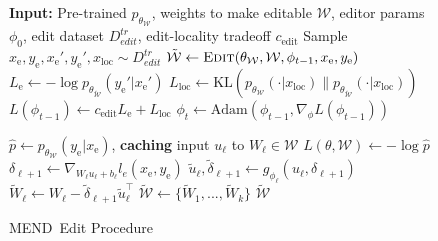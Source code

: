 \documentclass{article}
\newcommand{\name}{MEND}
\newcommand{\xe}{x_\text{e}}
\newcommand{\xloc}{x_\text{loc}}
\newcommand{\ye}{y_\text{e}}
\newcommand{\losse}{L_\text{e}}
\newcommand{\lossl}{L_\text{loc}}
\newcommand{\dtrain}{D^{tr}_{edit}}
\begin{document}
\begin{figure}
\begin{minipage}[t]{0.45\textwidth}
\begin{algorithm}[H]
\small
\caption{\name~Training}\label{alg:training}
\begin{algorithmic}[1]
\State \textbf{Input:} Pre-trained $p_{\theta_\mathcal{W}}$, weights to make editable $\mathcal{W}$, editor params $\phi_0$, edit dataset $\dtrain$, edit-locality tradeoff $c_\text{edit}$
    \State Sample $\xe,\ye,\xe',\ye',\xloc\sim \dtrain$
    \State $\mathcal{\tilde W} \gets \textsc{Edit}(\theta_\mathcal{W},\mathcal{W},\phi_{t-1},\xe,\ye)$
    \State $\losse \gets -\log p_{\theta_\mathcal{\tilde W}}(\ye'|\xe')$
    \State $\lossl \gets \text{KL}(p_{\theta_\mathcal{W}}(\cdot|\xloc) \| p_{\theta_\mathcal{\tilde W}}(\cdot|\xloc))$
    \State $L(\phi_{t-1}) \gets c_\text{edit} \losse + \lossl$
    \State $\phi_t \gets \text{Adam}\left(\phi_{t-1}, \nabla_\phi L(\phi_{t-1})\right)$
\EndFor
\end{algorithmic}\end{algorithm}\end{minipage} \hfill%
%
%
%
\begin{minipage}[t]{0.54\textwidth}
\begin{algorithm}[H]
\small
\caption{\name~Edit Procedure}\label{alg:edit-procedure}
\begin{algorithmic}[1]
\Procedure{Edit}{$\theta,\mathcal{W},\phi,\xe,\ye$}
    \State $\hat{p} \gets p_{\theta_\mathcal{W}}(\ye|\xe)$, \textbf{caching} input $u_\ell$ to $W_\ell\in\mathcal{W}$
    \State $L(\theta, \mathcal{W})\gets -\log \hat{p}$ 
        \State $\delta_{\ell+1} \gets \nabla_{W_\ell u_\ell + b_\ell} l_e(\xe,\ye)$ 
        \State $\tilde u_\ell,\tilde\delta_{\ell+1} \gets g_{\phi_\ell}(u_\ell,\delta_{\ell+1})$ 
        \State $\tilde W_\ell \gets W_\ell - \tilde\delta_{\ell+1}\tilde u_\ell^{\top}$ 
    \EndFor
    \State $\mathcal{\tilde{W}} \gets \{\tilde W_1,...,\tilde W_k\}$
    \State \Return $\mathcal{\tilde{W}}$ 
\EndProcedure
\end{algorithmic}\end{algorithm}\end{minipage}
\end{figure}
\end{document}
